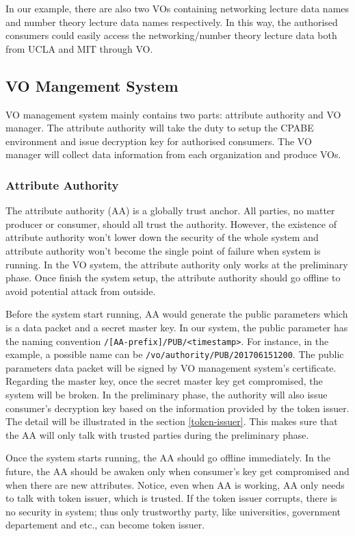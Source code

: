 In our example, there are also two VOs containing networking lecture data names and number theory lecture data names respectively.
In this way, the authorised consumers could easily access the networking/number theory lecture data both from UCLA and MIT through VO.

\subsection{VO Mangement System}

VO management system mainly contains two parts: attribute authority and VO manager.
The attribute authority will take the duty to setup the CPABE environment and issue decryption key for authorised consumers.
The VO manager will collect data information from each organization and produce VOs.

\subsubsection{Attribute Authority}
The attribute authority (AA) is a globally trust anchor.
All parties, no matter producer or consumer, should all trust the authority.
However, the existence of attribute authority won't lower down the security of the whole system and attribute authority won't become the single point of failure when system is running.
In the VO system, the attribute authority only works at the preliminary phase.
Once finish the system setup, the attribute authority should go offline to avoid potential attack from outside.

Before the system start running, AA would generate the public parameters which is a data packet and a secret master key.
In our system, the public parameter has the naming convention \texttt{/[AA-prefix]/PUB/<timestamp>}.
For instance, in the example, a possible name can be \texttt{/vo/authority/PUB/201706151200}.
The public parameters data packet will be signed by VO management system's certificate.
Regarding the master key, once the secret master key get compromised, the system will be broken.
In the preliminary phase, the authority will also issue consumer's decryption key based on the information provided by the token issuer.
The detail will be illustrated in the section \ref{token-issuer}.
This makes sure that the AA will only talk with trusted parties during the preliminary phase.

Once the system starts running, the AA should go offline immediately.
In the future, the AA should be awaken only when consumer's key get compromised and when there are new attributes.
Notice, even when AA is working, AA only needs to talk with token issuer, which is trusted.
If the token issuer corrupts, there is no security in system; thus only trustworthy party, like universities, government departement and etc., can become token issuer.

